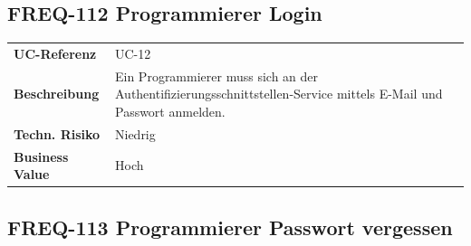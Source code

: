 \subsection{FREQ-112 Programmierer
Login}\label{freq-112-programmierer-login}

\begin{longtable}[c]{@{}ll@{}}
\toprule
\begin{minipage}[t]{0.20\columnwidth}\raggedright\strut
\textbf{UC-Referenz}
\strut\end{minipage} &
\begin{minipage}[t]{0.74\columnwidth}\raggedright\strut
UC-12
\strut\end{minipage}\tabularnewline
\begin{minipage}[t]{0.20\columnwidth}\raggedright\strut
\textbf{Beschreibung}
\strut\end{minipage} &
\begin{minipage}[t]{0.74\columnwidth}\raggedright\strut
Ein Programmierer muss sich an der
Authentifizierungsschnittstellen-Service mittels E-Mail und Passwort
anmelden.
\strut\end{minipage}\tabularnewline
\begin{minipage}[t]{0.20\columnwidth}\raggedright\strut
\textbf{Techn. Risiko}
\strut\end{minipage} &
\begin{minipage}[t]{0.74\columnwidth}\raggedright\strut
Niedrig
\strut\end{minipage}\tabularnewline
\begin{minipage}[t]{0.20\columnwidth}\raggedright\strut
\textbf{Business Value}
\strut\end{minipage} &
\begin{minipage}[t]{0.74\columnwidth}\raggedright\strut
Hoch
\strut\end{minipage}\tabularnewline
\bottomrule
\end{longtable}

\subsection{FREQ-113 Programmierer Passwort
vergessen}\label{freq-113-programmierer-passwort-vergessen}

